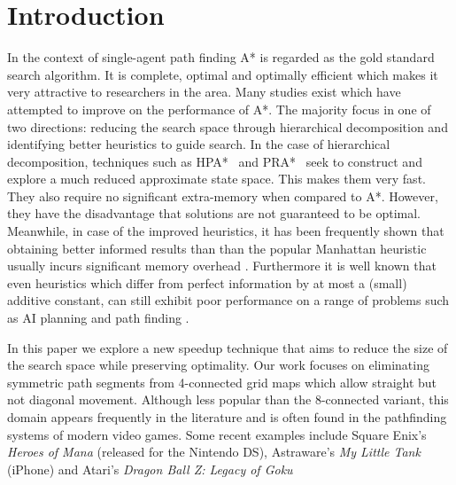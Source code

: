 \section{Introduction}
In the context of single-agent path finding A* \cite{hart68} is regarded as 
the gold standard search algorithm.
It is complete, optimal and optimally efficient which makes it very attractive 
to researchers in the area.
Many studies exist which have attempted to improve on the performance of A*. 
The majority focus in one of two directions: reducing the search space through hierarchical 
decomposition and identifying better heuristics to guide search. 
In the case of hierarchical decomposition, techniques such as
HPA*~\cite{botea04} and PRA*~\cite{sturtevant05} seek to construct and explore
a much reduced approximate state space.
This makes them very fast. 
They also require no significant extra-memory when compared to A*.
However, they have the disadvantage that solutions are not guaranteed to be optimal.
Meanwhile, in case of the improved heuristics, it has been frequently shown
that obtaining better informed results than than the popular
Manhattan heuristic usually incurs significant memory overhead 
\cite{goldberg05,Cazenave:06,bjornsson06}.
Furthermore it is well known that even heuristics which differ from perfect information 
by at most a (small) additive constant, can still exhibit poor performance on a range of 
problems such as AI planning and path finding \cite{helmert08,pohl77}.
\par
In this paper we explore a new speedup technique that aims to reduce the size of the search 
space while preserving optimality.
Our work focuses on eliminating symmetric path segments from 4-connected grid maps which
allow straight but not diagonal movement. 
Although less popular than the 8-connected variant, this domain appears frequently in the 
literature  \cite{yap02,wang08,pochter09} and is often found in the pathfinding systems of modern video games.
Some recent examples include Square Enix's \emph{Heroes of Mana} (released for the Nintendo DS),
Astraware's \emph{My Little Tank} (iPhone) and Atari's \emph{Dragon Ball Z: Legacy of Goku} 
